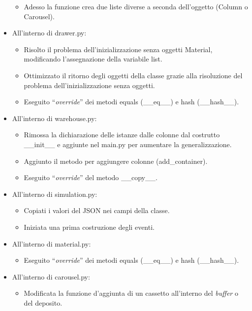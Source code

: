 \documentclass[a4paper]{article}
\newcommand{\dquotes}[1]{``#1''}
\begin{document}
\begin{itemize}[label=]
\begin{itemize}
				\item Adesso la funzione crea due liste diverse a seconda dell'oggetto (\textsf{Column} o \textsf{Carousel}).
			\end{itemize}
		
		\item All'interno di \textsf{drawer.py}:
			\begin{itemize}
				\item Risolto il problema dell'inizializzazione senza oggetti \textsf{Material}, modificando l'assegnazione della variabile \textsf{list}.
				
				\item Ottimizzato il ritorno degli oggetti della classe grazie alla risoluzione del problema dell'inizializzazione senza oggetti.
				
				\item Eseguito \dquotes{\emph{override}} dei metodi \textsf{equals (\_\_eq\_\_)} e \textsf{hash (\_\_hash\_\_)}.
			\end{itemize}
		
		\item All'interno di \textsf{warehouse.py}:
			\begin{itemize}
				\item Rimossa la dichiarazione delle istanze dalle colonne dal costrutto \textsf{\_\_init\_\_} e aggiunte nel \textsf{main.py} per aumentare la generalizzazione.
				
				\item Aggiunto il metodo per aggiungere colonne (\textsf{add\_container}).
				
				\item Eseguito \dquotes{\emph{override}} del metodo \textsf{\_\_copy\_\_}.
			\end{itemize}
		
		\item All'interno di \textsf{simulation.py}:
			\begin{itemize}
				\item Copiati i valori del \textsf{JSON} nei campi della classe.
				
				\item Iniziata una prima costruzione degli eventi.
			\end{itemize}
		
		\item All'interno di \textsf{material.py}:
			\begin{itemize}
				\item Eseguito \dquotes{\emph{override}} dei metodi \textsf{equals (\_\_eq\_\_)} e \textsf{hash (\_\_hash\_\_)}.
			\end{itemize}
		
		\item All'interno di \textsf{carousel.py}:
			\begin{itemize}
				\item Modificata la funzione d'aggiunta di un cassetto all'interno del \emph{buffer} o del deposito.
			\end{itemize}
	\end{itemize}
\end{document}
